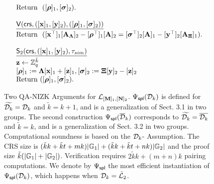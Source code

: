 \begin{figure}
$$\begin{array}{l}
\begin{array}{l}
     \text{Return } \  ([{\boldsymbol \rho}]_1,[{\boldsymbol \sigma}]_2).
    \\
    \\
\end{array}
\\
\begin{array}{l}
    \underline{\mathsf{V}(\mathsf{crs},([\mathbf{x}]_1,[\mathbf{y}]_2), ([{\boldsymbol \rho}]_1,[{\boldsymbol \sigma}]_2))}\\ [.1cm]
    \text{Return } \ ([\mathbf{x}^\top]_1 [\mathbf{{A_\Lambda}}]_2  - [{\boldsymbol \rho^\top}]_1[\mathbf{{A}}]_2=  [{\boldsymbol \sigma^\top}]_2 [\mathbf{{A}}]_1-[\mathbf{y}^\top]_2 [\mathbf{{A_\Xi}}]_1).
    \\
    \\
\end{array}
\\
\begin{array}{l}
    \underline{\mathsf{S}_2(\mathsf{crs},([\mathbf{x}]_1,[\mathbf{y}]_2),\tau_{sim})}\\[.1cm]
    \mathbf{z} \gets \mathbb{Z}_q^{\tilde{k}} \\ 
    {[{\boldsymbol \rho}]_1:=\mathbf{{\Lambda}} [\mathbf{x}]_1+ [\mathbf{z}]_1},{[{\boldsymbol \sigma}]_2:=\mathbf{{\Xi}} [\mathbf{y}]_2- [\mathbf{z}]_2}\\
    {\text{Return }  ([{\boldsymbol \rho}]_1,[{\boldsymbol \sigma}]_2).}
\end{array}
\\
\end{array}
$$
\caption{Two QA-NIZK Arguments for  $\mathcal{L}_{[\mathbf{{M}}]_1,[\mathbf{{N}}]_2}$. ${\Psi_{\mathsf{spl}}(\mathcal{D}_k)}$ is 
 defined for $\widetilde{\mathcal{D}_{k}}=\mathcal{D}_k$ and $\tilde{k}=k+1$, and is a generalization of  
 \cite{EC:KilWee15} Sect. 3.1 in two groups. The second construction ${\Psi_\mathsf{spl}(\overline{\mathcal{D}}_k)}$ corresponds to $\widetilde{\mathcal{D}_{k}}=\overline{\mathcal{D}_k}$ and $\tilde{k}=k$, and is a generalization of   \cite{EC:KilWee15} Sect. 3.2 in two groups. Computational soundness is based on the $\mathcal{D}_{k}$-\skermdh{} Assumption. The CRS size is $(\tilde{k}k+\tilde{k}t+mk)|\mathbb{G}_1|+(\tilde{k}k+\tilde{k}t+nk)|\mathbb{G}_2|$ and the proof size $\tilde{k}(|\mathbb{G}_1|+|\mathbb{G}_2|)$. Verification requires $2\tilde{k}k+(m+n)k$ pairing computations. We denote by $\Psi_{\mathsf{spl}}$ the most efficient instantiation of ${\Psi_{\mathsf{spl}}(\mathcal{D}_k)}$, which happens when $\mathcal{D}_k=\bar{\mathcal{L}}_2$. \label{fig:QANIZKtwogroups} }
\end{figure}

